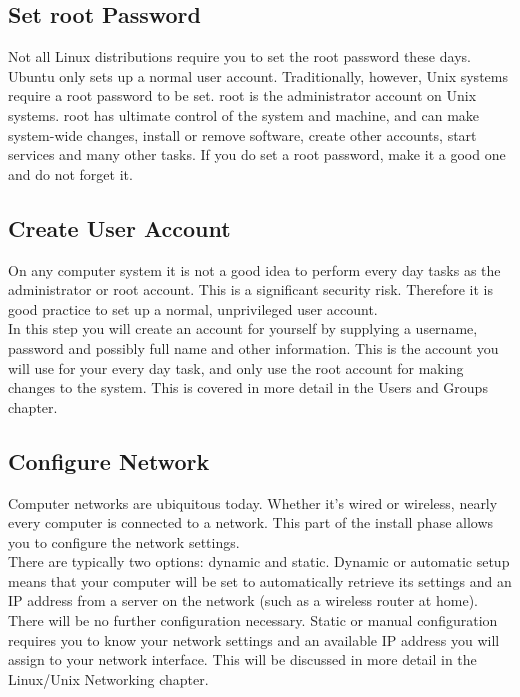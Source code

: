 \subsection{Set root Password}

Not all Linux distributions require you to set the root password these days.  Ubuntu only sets up a normal user account.  Traditionally, however, Unix systems require a root password to be set.  root is the administrator account on Unix systems.  root has ultimate control of the system and machine, and can make system-wide changes, install or remove software, create other accounts, start services and many other tasks.  If you do set a root password, make it a good one and do not forget it.

\subsection{Create User Account}

On any computer system it is not a good idea to perform every day tasks as the administrator or root account.  This is a significant security risk.  Therefore it is good practice to set up a normal, unprivileged user account.\\

In this step you will create an account for yourself by supplying a username, password and possibly full name and other information.  This is the account you will use for your every day task, and only use the root account for making changes to the system.  This is covered in more detail in the Users and Groups chapter.

\subsection{Configure Network}

Computer networks are ubiquitous today.  Whether it's wired or wireless, nearly every computer is connected to a network.  This part of the install phase allows you to configure the network settings.\\

There are typically two options: dynamic and static.  Dynamic or automatic setup means that your computer will be set to automatically retrieve its settings and an IP address from a server on the network (such as a wireless router at home).  There will be no further configuration necessary.  Static or manual configuration requires you to know your network settings and an available IP address you will assign to your network interface.  This will be discussed in more detail in the Linux/Unix Networking chapter.

